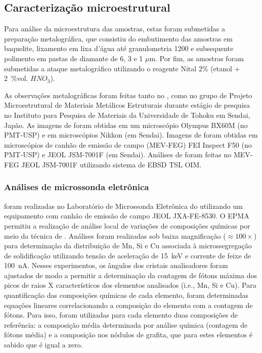 \subsection{Caracterização microestrutural}

Para análise da microestrutura das amostras, estas foram submetidas a preparação metalográfica, que consistiu do embutimento das amostras em baquelite, lixamento em lixa d'água até granulometria 1200 e subsequente polimento em pastas de diamante de 6, 3 e 1 $\mu$m. Por fim, as amostras foram submetidas a ataque metalográfico utilizando o reagente Nital 2\% (etanol + \SI{2}{\%vol.} $HNO_3$).

As observações metalográficas foram feitas tanto no , como no grupo de Projeto Microestrutural de Materiais Metálicos Estruturais durante estágio de pesquisa no Instituto para Pesquisa de Materiais da Universidade de Tohoku em Sendai, Japão. As imagens de  foram obtidas em um microscópio Olympus BX60M (no PMT-USP) e em microscópios Nikkon (em Sendai). Imagens de  foram obtidas em microscópios de canhão de emissão de campo (MEV-FEG) FEI Inspect F50 (no PMT-USP) e JEOL JSM-7001F (em Sendai). Análises de  foram feitas no MEV-FEG JEOL JSM-7001F utilizando sistema de EBSD TSL OIM. 


\subsubsection{Análises de microssonda eletrônica}

 foram realizadas no Laboratório de Microssonda Eletrônica do  utilizando um equipamento com canhão de emissão de campo JEOL JXA-FE-8530. O EPMA permitiu a realização de análise local de variações de composições químicas por meio da técnica de . Análises foram realizadas sob baixa magnificação ($\approx 100\times$) para determinação da distribuição de Mn, Si e Cu associada à microssegregação de solidificação utilizando tensão de aceleração de \SI{15}{keV} e corrente de feixe de \SI{100}{nA}. Nesses experimentos, os ângulos dos cristais analisadores foram ajustados de modo a permitir a determinação da contagem de fótons máxima dos picos de raios X característicos dos elementos analisados (i.e., Mn, Si e Cu). Para quantificação das composições químicas de cada elemento, foram determinadas equações lineares correlacionando a composição do elemento com a contagem de fótons. Para isso, foram utilizadas para cada elemento duas composições de referência: a composição média determinada por análise química (contagem de fótons média) e a composição nos nódulos de grafita, que para estes elementos é sabido que é igual a zero.

